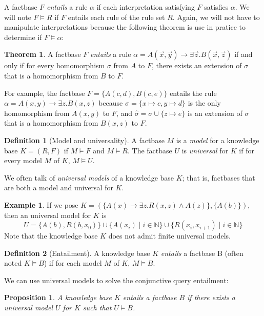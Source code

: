 \documentclass{article}
\newtheorem{proposition}{Proposition}[section]
\theoremstyle{definition}
\newtheorem{definition}{Definition}[section]
\newtheorem{theorem}{Theorem}[section]
\newtheorem{example}{Example}[section]
\theoremstyle{remark}
\def \N {\mathbb N}
\begin{document}
A factbase $F$ \emph{entails} a rule $\alpha$ if each interpretation satisfying $F$ satisfies $\alpha$. We will note $F \vDash R$ if $F$ entails each rule of the rule set $R$. Again, we will not have to manipulate interpretations because the following theorem is use in pratice to determine if $F \vDash \alpha$:

\begin{theorem}
A factbase $F$ \emph{entails} a rule $\alpha = A(\vec x,\vec y) \rightarrow \exists \vec z. B(\vec x,\vec z)$ if and only if for every homomorphism $\sigma$ from $A$ to $F$, there exists an extension of $\sigma$ that is a homomorphism from $B$ to $F$.
\end{theorem}

For example, the factbase $F=\{A(c,d),B(c,e)\}$ entails the rule $\alpha = A(x,y) \rightarrow \exists z. B(x,z)$ because $\sigma = \{x \mapsto c,y \mapsto d\}$ is the only homomorphism from $A(x,y)$ to $F$, and $\hat \sigma = \sigma \cup \{z \mapsto e\}$ is an extension of $\sigma$ that is a homomorphism from $B(x,z)$ to $F$. 

\begin{definition}[Model and universality]
A factbase $M$ is a \emph{model} for a knowledge base $K = (R,F)$ if $M \vDash F$ and $M \vDash R$. The factbase $U$ is \emph{universal} for $K$ if for every model $M$ of $K$, $M \vDash U$.
\end{definition}

We often talk of \emph{universal models} of a knowledge base $K$; that is, factbases that are both a model and universal for $K$. 

\begin{example}
	If we pose $K = (\{A(x) \rightarrow \exists z.R(x,z) \wedge A(z)\},\{A(b)\})$, then an universal model for $K$ is $$U = \{A(b),R(b,x_0)\}\cup \{A(x_i)\mid i \in \N\}\cup \{R(x_i,x_{i+1}) \mid i \in \N\}$$ Note that the knowledge base $K$ does not admit finite universal models.
\end{example}

\begin{definition}[Entailment]
A knowledge base $K$ \emph{entails} a factbase B (often noted $K \vDash B$) if for each model $M$ of $K$, $M \vDash B$.
\end{definition}

We can use universal models to solve the conjunctive query entailment:

\begin{proposition}
A knowledge base $K$ entails a factbase $B$ if there exists a universal model $U$ for $K$ such that $U \vDash B$.
\end{proposition}
\end{document}
